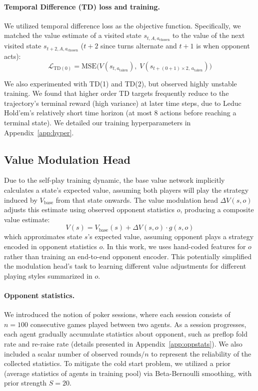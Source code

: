 \documentclass{article}
\begin{document}
\paragraph{Temporal Difference (TD) loss and training.}
We utilized temporal difference loss as the objective function. Specifically, we matched the value estimate of a visited state $s_{t,A,a_{\text{chosen}}}$ to the value of the next visited state $s_{t+2,A,a_{\text{chosen}}}$ ($t{+}2$ since turns alternate and $t{+}1$ is when opponent acts):
\begin{equation}
\mathcal{L}_{\text{TD}(0)} = \mathrm{MSE}\!\bigl(V(s_{t,a_{\text{taken}}}),\; V(s_{t+(0+1)\times 2,\,a_{\text{taken}}})\bigr)
\end{equation}

We also experimented with TD(1) and TD(2), but observed highly unstable training. We found that higher order TD targets frequently reduce to the trajectory's terminal reward (high variance) at later time steps, due to Leduc Hold'em's relatively short time horizon (at most 8 actions before reaching a terminal state). We detailed our training hyperparameters in Appendix~\ref{app:hyper}.

\subsection{Value Modulation Head}

Due to the self-play training dynamic, the base value network implicitly calculates a state's expected value, assuming both players will play the strategy induced by $V_{\text{base}}$ from that state onwards. The value modulation head $\Delta V(s,o)$ adjusts this estimate using observed opponent statistics $o$, producing a composite value estimate:
\begin{equation}
V(s) = V_{\text{base}}(s) + \Delta V(s,o) \cdot g(s,o)
\end{equation}
which approximates state $s$'s expected value, assuming opponent plays a strategy encoded in opponent statistics $o$. In this work, we uses hand-coded features for $o$ rather than training an end-to-end opponent encoder. This potentially simplified the modulation head's task to learning different value adjustments for different playing styles summarized in $o$.

\paragraph{Opponent statistics.}
We introduced the notion of poker sessions, where each session consists of $n=100$ consecutive games played between two agents. As a session progresses, each agent gradually accumulate statistics about opponent, such as preflop fold rate and re-raise rate (details presented in Appendix~\ref{app:oppstats}). We also included a scalar $\text{number of observed rounds}/n$ to represent the reliability of the collected statistics. To mitigate the cold start problem, we utilized a prior (average statistics of agents in training pool) via Beta-Bernoulli smoothing, with prior strength $S=20$.
\end{document}
